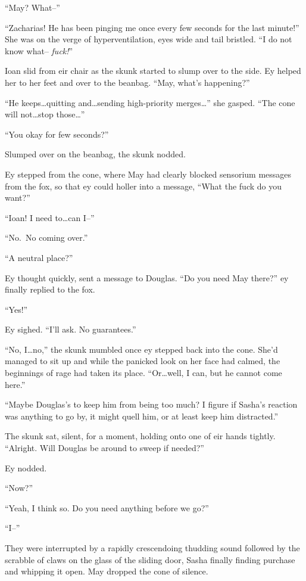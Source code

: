 ``May? What--''

``Zacharias! He has been pinging me once every few seconds for the last minute!'' She was on the verge of hyperventilation, eyes wide and tail bristled. ``I do not know what-- \emph{fuck!}''

Ioan slid from eir chair as the skunk started to slump over to the side. Ey helped her to her feet and over to the beanbag. ``May, what's happening?''

``He keeps\ldots quitting and\ldots sending high-priority merges\ldots{}'' she gasped. ``The cone will not\ldots stop those\ldots{}''

``You okay for few seconds?''

Slumped over on the beanbag, the skunk nodded.

Ey stepped from the cone, where May had clearly blocked sensorium messages from the fox, so that ey could holler into a message, ``What the fuck do you want?''

``Ioan! I need to\ldots can I--''

``No.~No coming over.''

``A neutral place?''

Ey thought quickly, sent a message to Douglas. ``Do you need May there?'' ey finally replied to the fox.

``Yes!''

Ey sighed. ``I'll ask. No guarantees.''

``No, I\ldots no,'' the skunk mumbled once ey stepped back into the cone. She'd managed to sit up and while the panicked look on her face had calmed, the beginnings of rage had taken its place. ``Or\ldots well, I can, but he cannot come here.''

``Maybe Douglas's to keep him from being too much? I figure if Sasha's reaction was anything to go by, it might quell him, or at least keep him distracted.''

The skunk sat, silent, for a moment, holding onto one of eir hands tightly. ``Alright. Will Douglas be around to sweep if needed?''

Ey nodded.

``Now?''

``Yeah, I think so. Do you need anything before we go?''

``I--''

They were interrupted by a rapidly crescendoing thudding sound followed by the scrabble of claws on the glass of the sliding door, Sasha finally finding purchase and whipping it open. May dropped the cone of silence.

